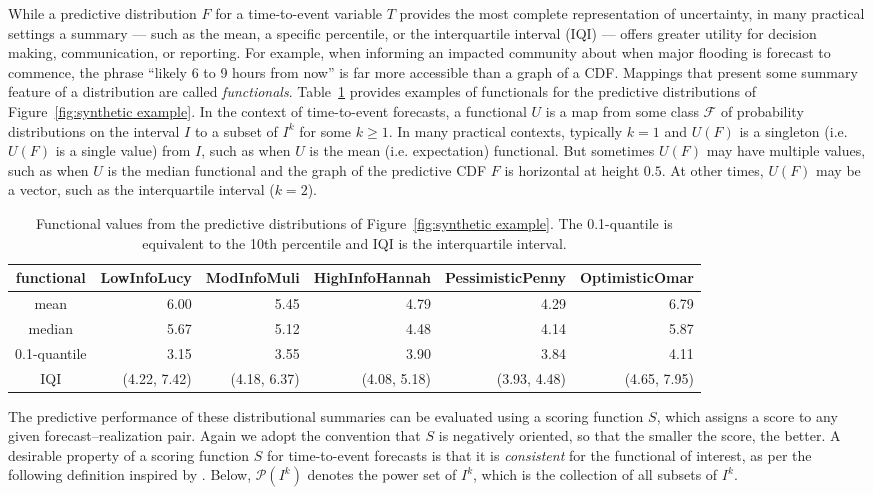 \documentclass[10pt]{article} %
\theoremstyle{theorem}
\theoremstyle{definition}
\begin{document}
While a predictive distribution $F$ for a time-to-event variable $T$ provides the most complete representation of uncertainty, in many practical settings a summary --- such as the mean, a specific percentile, or the interquartile interval (IQI) --- offers greater utility for decision making, communication, or reporting. For example, when informing an impacted community about when major flooding is forecast to commence, the phrase ``likely 6 to 9 hours from now'' is far more accessible than a graph of a CDF. Mappings that present some summary feature of a distribution are called \textit{functionals}. Table~\ref{tab:functional examples} provides examples of functionals for the predictive distributions of Figure~\ref{fig:synthetic example}. In the context of time-to-event forecasts, a functional $U$ is a map from some class $\mathcal{F}$ of probability distributions on the interval $I$ to a subset of $I ^k$ for some $k\geq1$. In many practical contexts, typically $k=1$ and $U(F)$ is a singleton (i.e. $U(F)$ is a single value) from $I$, such as when $U$ is the mean (i.e. expectation) functional. But sometimes $U(F)$ may have multiple values, such as when $U$ is the median functional and the graph of the predictive CDF $F$ is horizontal at height $0.5$. At other times, $U(F)$ may be a vector, such as the interquartile interval ($k=2$).

\begin{table}[t!]
    \renewcommand{\arraystretch}{1.2} %
    \centering  \scriptsize
    \begin{tabular}{|c|r|r|r|r|r|}
    \hline
        functional & LowInfoLucy & ModInfoMuli & HighInfoHannah & PessimisticPenny & OptimisticOmar \\ \hline
        mean & 6.00 & 5.45 & 4.79 & 4.29 & 6.79 \\ 
        median & 5.67 & 5.12 & 4.48 & 4.14 & 5.87 \\ 
        0.1-quantile & 3.15 & 3.55 & 3.90 & 3.84 & 4.11 \\
        IQI & (4.22, 7.42) & (4.18, 6.37) & (4.08, 5.18) & (3.93, 4.48) & (4.65, 7.95) \\ \hline
    \end{tabular}
    \caption{Functional values from the predictive distributions of Figure~\ref{fig:synthetic example}. The 0.1-quantile is equivalent to the 10th percentile and IQI is the interquartile interval.}
    \label{tab:functional examples}
\end{table}


The predictive performance of these distributional summaries can be evaluated using a scoring function $S$, which assigns a score to any given forecast--realization pair. Again we adopt the convention that $S$ is negatively oriented, so that the smaller the score, the better. A desirable property of a scoring function $S$ for time-to-event forecasts is that it is \textit{consistent} for the functional of interest, as per the following definition inspired by \cite{gneiting2011making}. Below, $\mathcal{P}(I^k)$ denotes the power set of $I^k$, which is the collection of all subsets of $I^k$.
\end{document}
